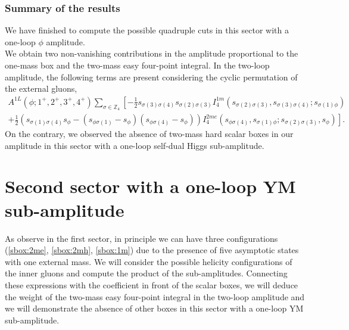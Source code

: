 \subsubsection{Summary of the results}
We have finished to compute the possible quadruple cuts in this sector with a one-loop $\phi$ amplitude.\\
We obtain two non-vanishing contributions in the amplitude proportional to the one-mass box and the two-mass easy four-point integral. In the two-loop amplitude, the following terms are present considering the cyclic permutation of the external gluons,
\begin{align*}
	A^{1L}(\phi;1^+,2^+,3^+,4^+) \sum_{\sigma\in\mathbb{Z}_4} \left[-\frac{1}{2}s_{\sigma(3)\sigma(4)}s_{\sigma(2)\sigma(3)} I_4^{1m}(s_{\sigma(2)\sigma(3)},s_{\sigma(3)\sigma(4)};s_{\sigma(1)\phi})\right.\\ \left.+\frac{1}{2}\left(s_{\sigma(1)\sigma(4)}s_\phi-(s_{\phi \sigma(1)}-s_\phi)(s_{\phi \sigma(4)}-s_\phi)\right)I_4^{2me}(s_{\phi\sigma(4)},s_{\sigma(1)\phi};s_{\sigma(2)\sigma(3)},s_\phi)
	\right].
\end{align*}
On the contrary, we observed the absence of two-mass hard scalar boxes in our amplitude in this sector with a one-loop self-dual Higgs sub-amplitude.

\section{Second sector with a one-loop YM sub-amplitude}
As observe in the first sector, in principle we can have three configurations (\ref{sbox:2me}, \ref{sbox:2mh}, \ref{sbox:1m}) due to the presence of five asymptotic states with one external mass. We will consider the possible helicity configurations of the inner gluons and compute the product of the sub-amplitudes. Connecting these expressions with the coefficient in front of the scalar boxes, we will deduce the weight of the two-mass easy four-point integral in the two-loop amplitude and we will demonstrate the absence of other boxes in this sector with a one-loop YM sub-amplitude.
